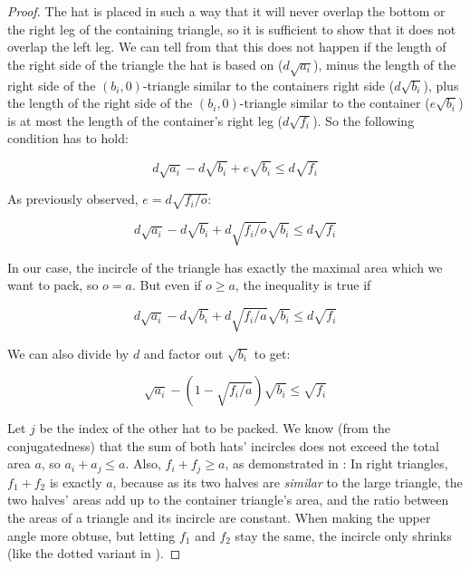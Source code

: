 \documentclass[a4paper,style=print,bibliography=totoc,nexus,lnum,extramargin]{tubsbook}
\begin{document}
\begin{proof}

    The hat is placed in such a way that it will never overlap the bottom or the right leg of the containing triangle, so it is sufficient to show that it does not overlap the left leg.
    We can tell from  that this does not happen if the length of the right side of the triangle the hat is based on ($d\sqrt{a_i}$), minus the length of the right side of the $(b_i,0)$-triangle similar to the containers right side ($d\sqrt{b_i}$), plus the length of the right side of the $(b_i,0)$-triangle similar to the container ($e\sqrt{b_i}$) is at most the length of the container's right leg ($d\sqrt{f_i}$). So the following condition has to hold:

    \begin{equation*}
        d\sqrt{a_i} - d\sqrt{b_i} + e\sqrt{b_i} \le d\sqrt{f_i}
    \end{equation*}

    As previously observed, $e = d\sqrt{f_i/o}$:

    \begin{equation*}
        d\sqrt{a_i} - d\sqrt{b_i} + d\sqrt{f_i/o}\sqrt{b_i} \le d\sqrt{f_i}
    \end{equation*}

    In our case, the incircle of the triangle has exactly the maximal area which we want to pack, so $o = a$. But even if $o \ge a$, the inequality is true if

    \begin{equation*}
        d\sqrt{a_i} - d\sqrt{b_i} + d\sqrt{f_i/a}\sqrt{b_i} \le d\sqrt{f_i}
    \end{equation*}

    We can also divide by $d$ and factor out $\sqrt{b_i}$ to get:

    \begin{equation}\label{eq:tripoke}
        \sqrt{a_i} - (1-\sqrt{f_i/a})\sqrt{b_i} \le \sqrt{f_i}
    \end{equation}


    Let $j$ be the index of the other hat to be packed.
    We know (from the conjugatedness) that the sum of both hats' incircles does not exceed the total area $a$, so $a_i + a_j \le a$. Also, $f_i + f_j \ge a$, as demonstrated in : In right triangles, $f_1 + f_2$ is exactly $a$, because as its two halves are \emph{similar} to the large triangle, the two halves' areas add up to the container triangle's area, and the ratio between the areas of a triangle and its incircle are constant. When making the upper angle more obtuse, but letting $f_1$ and $f_2$ stay the same, the incircle only shrinks (like the dotted variant in ).


\end{proof}
\end{document}

